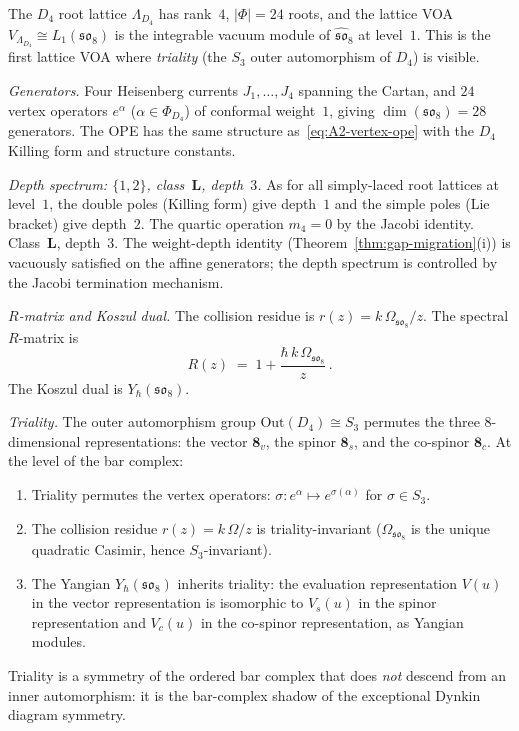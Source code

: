 \begin{computation}%
\label{comp:lattice-voa-D4-ordered-bar}%
%
%
%
The $D_4$ root lattice $\Lambda_{D_4}$ has rank~$4$,
$|\Phi| = 24$ roots, and the lattice VOA
$V_{\Lambda_{D_4}} \cong L_1(\mathfrak{so}_8)$ is the
integrable vacuum module of $\widehat{\mathfrak{so}}_8$ at
level~$1$. This is the first lattice VOA where \emph{triality}
(the $S_3$ outer automorphism of $D_4$) is visible.

\smallskip
\noindent
\emph{Generators.}
Four Heisenberg currents $J_1, \ldots, J_4$ spanning the Cartan,
and $24$ vertex operators $e^\alpha$ ($\alpha \in \Phi_{D_4}$) of
conformal weight~$1$, giving $\dim(\mathfrak{so}_8) = 28$ generators.
The OPE has the same structure as~\eqref{eq:A2-vertex-ope}
with the $D_4$ Killing form and structure constants.

\smallskip
\noindent
\emph{Depth spectrum: $\{1,2\}$, class~$\mathbf{L}$, depth~$3$.}
As for all simply-laced root lattices at level~$1$, the double
poles (Killing form) give depth~$1$ and the simple poles
(Lie bracket) give depth~$2$. The quartic operation $m_4 = 0$
by the Jacobi identity. Class~$\mathbf{L}$, depth~$3$.
The weight-depth identity (Theorem~\ref{thm:gap-migration}(i)) is vacuously satisfied on the affine generators; the depth spectrum is controlled by the Jacobi termination mechanism.

\smallskip
\noindent
\emph{$R$-matrix and Koszul dual.}
The collision residue is $r(z) = k\,\Omega_{\mathfrak{so}_8}/z$.
The spectral $R$-matrix is
\begin{equation}\label{eq:D4-lattice-R}
R(z) \;=\; 1 + \frac{\hbar\,k\,\Omega_{\mathfrak{so}_8}}{z}\,.
\end{equation}
The Koszul dual is $Y_\hbar(\mathfrak{so}_8)$.

\smallskip
\noindent
\emph{Triality.}
The outer automorphism group $\mathrm{Out}(D_4) \cong S_3$
permutes the three $8$-dimensional representations:
the vector $\mathbf{8}_v$, the spinor $\mathbf{8}_s$, and
the co-spinor $\mathbf{8}_c$. At the level of the bar complex:
\begin{enumerate}[label=\textup{(\roman*)},nosep]
\item Triality permutes the vertex operators:
 $\sigma \colon e^{\alpha} \mapsto e^{\sigma(\alpha)}$
 for $\sigma \in S_3$.
\item The collision residue $r(z) = k\,\Omega/z$ is triality-invariant
 ($\Omega_{\mathfrak{so}_8}$ is the unique quadratic
 Casimir, hence $S_3$-invariant).
\item The Yangian $Y_\hbar(\mathfrak{so}_8)$ inherits triality:
 the evaluation representation $V(u)$ in the vector
 representation is isomorphic to $V_s(u)$ in the spinor
 representation and $V_c(u)$ in the co-spinor representation,
 as Yangian modules.
\end{enumerate}
Triality is a symmetry of the ordered bar complex that does
\emph{not} descend from an inner automorphism: it is the
bar-complex shadow of the exceptional Dynkin diagram symmetry.


\end{computation}
